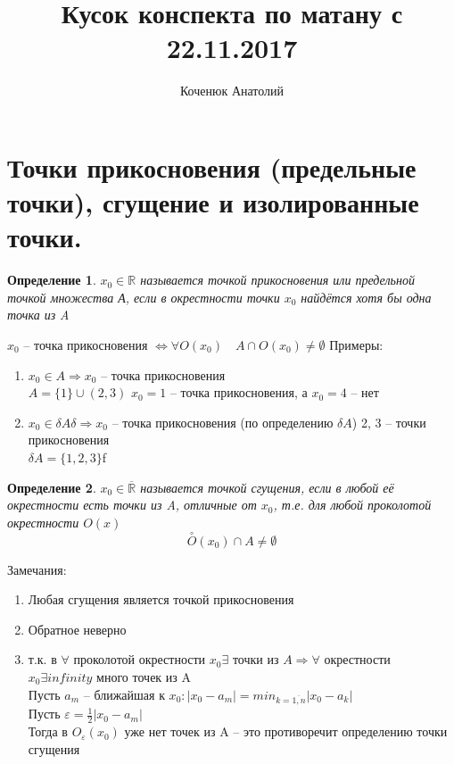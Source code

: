 \documentclass{book}
\author{Коченюк Анатолий}
\title{Кусок конспекта по матану с 22.11.2017}
\newtheorem{Def}{Определение}[chapter]
\begin{document}
\maketitle
\section{Точки прикосновения (предельные точки), сгущение и изолированные точки.}
\begin{Def}
$x_0 \in \mathds{R}$ называется точкой прикосновения или предельной точкой множества А, если в окрестности точки $x_0$ найдётся хотя бы одна точка из A
\end{Def}
$x_0$ -- точка прикосновения $\Longleftrightarrow \forall O(x_0)\quad A\cap O(x_0)\neq \emptyset$
Примеры:
\begin{enumerate}
	\item $x_0\in A \Rightarrow x_0$ -- точка прикосновения\\
	$A = \{1\}\cup (2, 3)$    $x_0 =1$ -- точка прикосновения, а $x_0 = 4$ -- нет
	\item $x_0 \in \delta A\delta \Rightarrow x_0$ -- точка прикосновения (по определению $\delta A$)   2, 3 -- точки прикосновения\\
	$\delta A = \{1, 2, 3\}$f
\end{enumerate}
\begin{Def}
	$x_0 \in \overline{\mathds{R}}$ называется точкой сгущения, если в любой её окрестности есть точки из A, отличные от $x_0$, т.е. для любой проколотой окрестности $O(x)$
	$$\overset{\circ}{O}(x_0) \cap A \neq \emptyset$$
\end{Def}

Замечания:
\begin{enumerate}
	\item Любая сгущения является точкой прикосновения
	\item Обратное неверно
	\item т.к. в $\forall$ проколотой окрестности $x_0 \exists$ точки из $A \Rightarrow \forall$ окрестности $x_0 \exists infinity$ много точек из A\\
	Пусть $a_m $ -- ближайшая к $x_0 : |x_0-a_m|=min_{k = \overline{1, n}}|x_0-a_k|$ \\
	Пусть $\varepsilon = \frac{1}{2}|x_0 - a_m|$\\
	Тогда в $O_{\varepsilon}(x_0)$ уже нет точек из A -- это противоречит определению точки сгущения
\end{enumerate}
\end{document}
